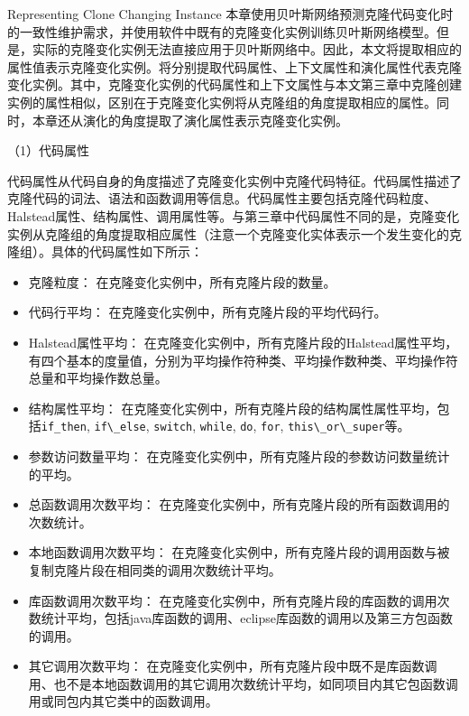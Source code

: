 {Representing Clone Changing Instance}
\label{lab-changingattribute}
本章使用贝叶斯网络预测克隆代码变化时的一致性维护需求，并使用软件中既有的克隆变化实例训练贝叶斯网络模型。但是，实际的克隆变化实例无法直接应用于贝叶斯网络中。因此，本文将提取相应的属性值表示克隆变化实例。将分别提取代码属性、上下文属性和演化属性代表克隆变化实例。其中，克隆变化实例的代码属性和上下文属性与本文第三章中克隆创建实例的属性相似，区别在于克隆变化实例将从克隆组的角度提取相应的属性。同时，本章还从演化的角度提取了演化属性表示克隆变化实例。



（1）代码属性

代码属性从代码自身的角度描述了克隆变化实例中克隆代码特征。代码属性描述了克隆代码的词法、语法和函数调用等信息。代码属性主要包括克隆代码粒度、Halstead属性、结构属性、调用属性等。与第三章中代码属性不同的是，克隆变化实例从克隆组的角度提取相应属性（注意一个克隆变化实体表示一个发生变化的克隆组）。具体的代码属性如下所示：
\begin{itemize}
\item 
克隆粒度：
在克隆变化实例中，所有克隆片段的数量。
\item 
代码行平均：
在克隆变化实例中，所有克隆片段的平均代码行。
\item 
Halstead属性平均：
在克隆变化实例中，所有克隆片段的Halstead属性平均，有四个基本的度量值，分别为平均操作符种类、平均操作数种类、平均操作符总量和平均操作数总量。
\item
结构属性平均：
在克隆变化实例中，所有克隆片段的结构属性属性平均，包括\verb+if_then+, \verb+if\_else+, \verb+switch+, \verb+while+, \verb+do+, \verb+for+,  \verb+this\_or\_super+等。 
\item 
参数访问数量平均：
在克隆变化实例中，所有克隆片段的参数访问数量统计的平均。
\item  
总函数调用次数平均：
在克隆变化实例中，所有克隆片段的所有函数调用的次数统计。
\item  
本地函数调用次数平均：
在克隆变化实例中，所有克隆片段的调用函数与被复制克隆片段在相同类的调用次数统计平均。
\item  
库函数调用次数平均：
在克隆变化实例中，所有克隆片段的库函数的调用次数统计平均，包括java库函数的调用、eclipse库函数的调用以及第三方包函数的调用。
\item  
其它调用次数平均：
在克隆变化实例中，所有克隆片段中既不是库函数调用、也不是本地函数调用的其它调用次数统计平均，如同项目内其它包函数调用或同包内其它类中的函数调用。
\end{itemize}


